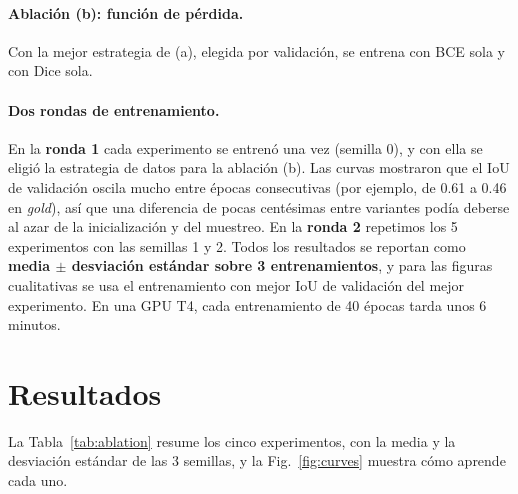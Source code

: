 \documentclass{article}
\newcommand{\RES}[1]{\textcolor{red}{#1}}
\begin{document}
\paragraph{Ablación (b): función de pérdida.} Con la mejor estrategia de (a), elegida por validación,
se entrena con BCE sola y con Dice sola.

\paragraph{Dos rondas de entrenamiento.} En la \textbf{ronda 1} cada experimento se entrenó una vez
(semilla 0), y con ella se eligió la estrategia de datos para la ablación (b). Las curvas mostraron
que el IoU de validación oscila mucho entre épocas consecutivas (por ejemplo, de 0.61 a 0.46 en
\emph{gold}), así que una diferencia de pocas centésimas entre variantes podía deberse al azar de la
inicialización y del muestreo. En la \textbf{ronda 2} repetimos los 5 experimentos con las semillas 1 y
2. Todos los resultados se reportan como \textbf{media $\pm$ desviación estándar sobre 3
entrenamientos}, y para las figuras cualitativas se usa el entrenamiento con mejor IoU de validación del
mejor experimento. En una GPU T4, cada entrenamiento de 40 épocas tarda unos 6 minutos.

\section{Resultados}

La Tabla~\ref{tab:ablation} resume los cinco experimentos, con la media y la desviación estándar de las
3 semillas, y la Fig.~\ref{fig:curves} muestra cómo aprende cada uno.

\begin{table}[H]
  \caption{Ablación. IoU, precisión (P) y recall (R) de la clase agua. Test: chips dorados de los eventos
  vistos; Bolivia: evento retenido con etiquetas doradas; Lima: región propia (S1 17-mar-2017 + EMSN038).
  Media $\pm$ desviación estándar sobre 3 semillas; P y R son medias. La selección se hace solo por
  IoU$_{val}$.}
  \label{tab:ablation}
  \centering
  \scriptsize
  \setlength{\tabcolsep}{3.5pt}
  \IfFileExists{ablation.tex}{\resizebox{\linewidth}{!}{}}{\RES{[falta ablation.tex]}}
\end{table}
\end{document}
